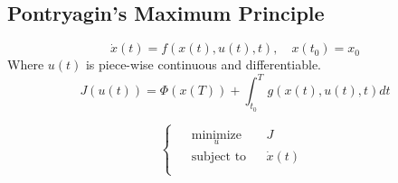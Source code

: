 \documentclass{article}
\begin{document}
\subsection{Pontryagin's Maximum Principle}

\[
\dot x(t) = f\left(x(t),u(t), t\right), \quad x(t_0) = x_0
\]
Where $u(t)$ is piece-wise continuous and differentiable.
\[
J(u(t)) = \Phi(x(T)) + \int^T_{t_0}{g(x(t), u(t), t) dt}
\]

\[
\left\{\begin{array}{l}
\begin{aligned}
& \underset{u}{\text{minimize}} & & J \\
& \text{subject to} & & \dot{x}(t) \\
\end{aligned}
\end{array}\right.
\]
\end{document}
